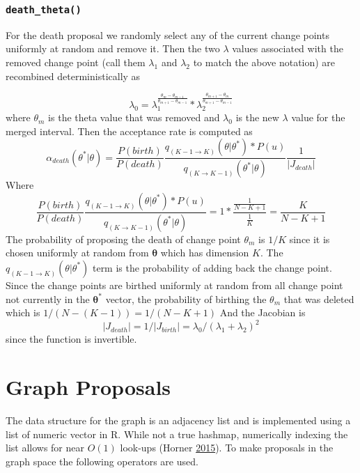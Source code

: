 \documentclass[11pt,a4paper]{article}
\numberwithin{equation}{section}
\begin{document}
\hypertarget{death_theta}{%
\subsubsection{\texorpdfstring{\texttt{death\_theta()}}{death\_theta()}}\label{death_theta}}

For the death proposal we randomly select any of the current change
points uniformly at random and remove it. Then the two \(\lambda\)
values associated with the removed change point (call them \(\lambda_1\)
and \(\lambda_2\) to match the above notation) are recombined
deterministically as

\[ \lambda_0 =\lambda_1^{\frac{\theta_m-\theta_{m-1}}{\theta_{m+1}-\theta_{m-1}}}*\lambda_2^{\frac{\theta_{m+1}-\theta_{m}}{\theta_{m+1}-\theta_{m-1}}} \]
where \(\theta_m\) is the theta value that was removed and \(\lambda_0\)
is the new \(\lambda\) value for the merged interval. Then the
acceptance rate is computed as
\[\alpha_{death}(\theta^*|\theta) = \frac{P(birth)}{P(death)}\frac{q_{(K-1\rightarrow K)}(\theta|\theta^*)*P(u)}{q_{(K\rightarrow K - 1)}(\theta^*|\theta)}\frac{1}{|J_{death}|}\]
Where
\[ \frac{P(birth)}{P(death)}\frac{q_{(K-1\rightarrow K)}(\theta|\theta^*)*P(u)}{q_{(K\rightarrow K - 1)}(\theta^*|\theta)} = 1*\frac{\frac{1}{N-K+1}}{\frac{1}{K}} = \frac{K}{N-K+1} \]
The probability of proposing the death of change point \(\theta_m\) is
\(1/K\) since it is chosen uniformly at random from
\(\boldsymbol{\theta}\) which has dimension \(K\). The
\(q_{(K-1\rightarrow K)}(\theta|\theta^*)\) term is the probability of
adding back the change point. Since the change points are birthed
uniformly at random from all change point not currently in the
\(\boldsymbol{\theta^*}\) vector, the probability of birthing the
\(\theta_m\) that was deleted which is \(1/(N-(K-1)) = 1/(N-K+1)\) And
the Jacobian is
\[|J_{death}| = 1/|J_{birth}| = \lambda_0/(\lambda_1 + \lambda_2)^2\]
since the function is invertible. 

\hypertarget{graph-proposals}{%
\section{Graph Proposals}\label{graph-proposals}}

The data structure for the graph is an adjacency list and is implemented
using a list of numeric vector in R. While not a true hashmap,
numerically indexing the list allows for near \(O(1)\) look-ups (Horner
\protect\hyperlink{ref-horner_hash_2015}{2015}). To make proposals in
the graph space the following operators are used.
\end{document}
